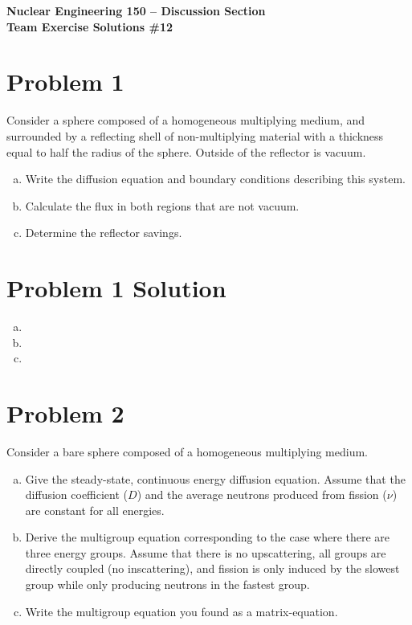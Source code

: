 \documentclass{report}
\begin{document}
\begin{center}
\textbf{\large Nuclear Engineering 150 -- Discussion Section}\\ 
\textbf{Team Exercise Solutions \#12}
\end{center}

\section*{Problem 1}

Consider a sphere composed of a homogeneous multiplying medium, and surrounded by a reflecting shell of non-multiplying material with a thickness equal to half the radius of the sphere. Outside of the reflector is vacuum.
\begin{enumerate}[a)]
\item Write the diffusion equation and boundary conditions describing this system.
\item Calculate the flux in both regions that are not vacuum.
\item Determine the reflector savings.
\end{enumerate}



\section*{Problem 1 Solution}

\begin{enumerate}[a)]

\item 
\item
\item

\end{enumerate}


\newpage
\section*{Problem 2}

Consider a bare sphere composed of a homogeneous multiplying medium.
\begin{enumerate}[a)]
\item Give the steady-state, continuous energy diffusion equation. Assume that the diffusion coefficient ($D$) and the average neutrons produced from fission ($\nu$) are constant for all energies.
\item Derive the multigroup equation corresponding to the case where there are three energy groups. Assume that there is no upscattering, all groups are directly coupled (no inscattering), and fission is only induced by the slowest group while only producing neutrons in the fastest group.
\item Write the multigroup equation you found as a matrix-equation.
\end{enumerate}
\end{document}
